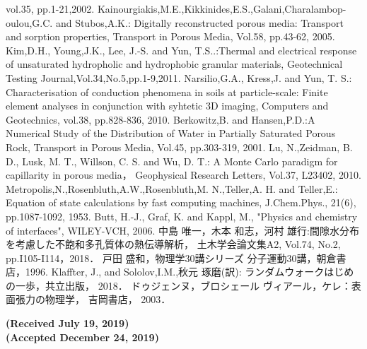 \documentclass{jsce}
\begin{document}
\begin{thebibliography}{99}
\begin{spacing}{1.175}
	vol.35, pp.1-21,2002.
	Kainourgiakis,M.E.,Kikkinides,E.S.,Galani,Charalambop-oulou,G.C. and Stubos,A.K.:
	Digitally reconstructed porous media: Transport and sorption properties,
	Transport in Porous Media, Vol.58, pp.43-62, 2005.
	Kim,D.H., Young,J.K., Lee, J.-S. and Yun, T.S..:Thermal and electrical response of unsaturated hydropholic and hydrophobic granular materials,
	 Geotechnical Testing Journal,Vol.34,No.5,pp.1-9,2011.
	Narsilio,G.A., Kress,J. and Yun, T. S.:
	Characterisation of conduction phenomena in soils at particle-scale: 
	Finite element analyses in conjunction with syhtetic 3D imaging, Computers and Geotechnics, vol.38, pp.828-836, 2010.
        Berkowitz,B. and Hansen,P.D.:A Numerical Study of the Distribution of 	Water in Partially Saturated Porous Rock, 
	Transport in Porous Media, Vol.45, pp.303-319, 2001.
        Lu, N.,Zeidman, B. D., Lusk, M. T., Willson, C. S. and Wu, D. T.: 
	A Monte Carlo paradigm for capillarity in porous media， Geophysical Research Letters, Vol.37, L23402, 2010.
	Metropolis,N.,Rosenbluth,A.W.,Rosenbluth,M. N.,Teller,A. H. and	Teller,E.:
		Equation of state calculations by fast computing machines, 
	J.Chem.Phys., 21(6), pp.1087-1092, 1953.
	Butt, H.-J., Graf, K. and Kappl, M., 
	"Physics and chemistry of interfaces", WILEY-VCH, 2006.
	中島 唯一，木本 和志，河村 雄行:間隙水分布を考慮した不飽和多孔質体の熱伝導解析， 
	土木学会論文集A2, Vol.74, No.2, pp.I105-I114，2018．
	戸田 盛和，物理学30講シリーズ 分子運動30講，朝倉書店，1996.
	Klaffter, J., and Sololov,I.M.,秋元 琢磨(訳): 
	ランダムウォークはじめの一歩，共立出版， 2018．
ドゥジェンヌ，ブロシェール ヴィアール，ケレ：表面張力の物理学， 吉岡書店， 2003．
\end{spacing}
\end{thebibliography}
\vspace{-5mm}
\begin{flushright}
	\small
	\bf{ (Received July 19, 2019)\\
	(Accepted December 24, 2019)}
\end{flushright}
\newpage
\lastpagecontrol[1cm]{25.7cm}
\end{document}
